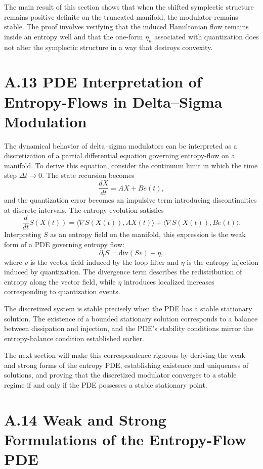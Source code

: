 The main result of this section shows that when the shifted symplectic structure remains positive definite on the truncated manifold, the modulator remains stable. The proof involves verifying that the induced Hamiltonian flow remains inside an entropy well and that the one-form \(\eta_n\) associated with quantization does not alter the symplectic structure in a way that destroys convexity.

\section{A.13 PDE Interpretation of Entropy-Flows in Delta–Sigma Modulation}

The dynamical behavior of delta–sigma modulators can be interpreted as a discretization of a partial differential equation governing entropy-flow on a manifold. To derive this equation, consider the continuum limit in which the time step \(\Delta t\to 0\). The state recursion becomes
\[
\frac{dX}{dt} = A X + B e(t),
\]
and the quantization error becomes an impulsive term introducing discontinuities at discrete intervals. The entropy evolution satisfies
\[
\frac{d}{dt} S(X(t)) = \langle \nabla S(X(t)), A X(t) \rangle + \langle \nabla S(X(t)), B e(t) \rangle.
\]
Interpreting \(S\) as an entropy field on the manifold, this expression is the weak form of a PDE governing entropy flow:
\[
\partial_t S = \mathrm{div}(S v) + \eta,
\]
where \(v\) is the vector field induced by the loop filter and \(\eta\) is the entropy injection induced by quantization. The divergence term describes the redistribution of entropy along the vector field, while \(\eta\) introduces localized increases corresponding to quantization events.

The discretized system is stable precisely when the PDE has a stable stationary solution. The existence of a bounded stationary solution corresponds to a balance between dissipation and injection, and the PDE's stability conditions mirror the entropy-balance condition established earlier.

The next section will make this correspondence rigorous by deriving the weak and strong forms of the entropy PDE, establishing existence and uniqueness of solutions, and proving that the discretized modulator converges to a stable regime if and only if the PDE possesses a stable stationary point.

\section{A.14 Weak and Strong Formulations of the Entropy-Flow PDE}

